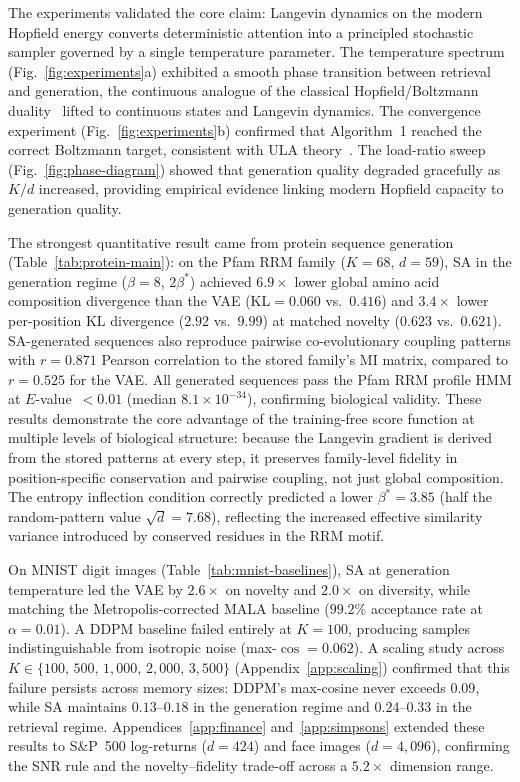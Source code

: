 
The experiments validated the core claim: Langevin dynamics on the modern Hopfield energy converts deterministic attention into a principled stochastic sampler governed by a single temperature parameter.
The temperature spectrum (Fig.~\ref{fig:experiments}a) exhibited a smooth phase transition between retrieval and generation, the continuous analogue of the classical Hopfield/Boltzmann duality~\cite{ackeleyLearningAlgorithmBoltzmann1985} lifted to continuous states and Langevin dynamics. The convergence experiment (Fig.~\ref{fig:experiments}b) confirmed that Algorithm~1 reached the correct Boltzmann target, consistent with ULA theory~\cite{durmusNonasymptoticAnalysisUnadjusted2017}. The load-ratio sweep (Fig.~\ref{fig:phase-diagram}) showed that generation quality degraded gracefully as $K/d$ increased, providing empirical evidence linking modern Hopfield capacity to generation quality.

The strongest quantitative result came from protein sequence generation (Table~\ref{tab:protein-main}): on the Pfam RRM family ($K{=}68$, $d{=}59$), SA in the generation regime ($\beta{=}8$, $2\beta^*$) achieved $6.9{\times}$ lower global amino acid composition divergence than the VAE (KL${=}0.060$ vs.\ $0.416$) and $3.4{\times}$ lower per-position KL divergence ($2.92$ vs.\ $9.99$) at matched novelty ($0.623$ vs.\ $0.621$). SA-generated sequences also reproduce pairwise co-evolutionary coupling patterns with $r{=}0.871$ Pearson correlation to the stored family's MI matrix, compared to $r{=}0.525$ for the VAE. All generated sequences pass the Pfam RRM profile HMM at $E$-value~$<0.01$ (median $8.1{\times}10^{-34}$), confirming biological validity. These results demonstrate the core advantage of the training-free score function at multiple levels of biological structure: because the Langevin gradient is derived from the stored patterns at every step, it preserves family-level fidelity in position-specific conservation and pairwise coupling, not just global composition. The entropy inflection condition correctly predicted a lower $\beta^*{=}3.85$ (half the random-pattern value $\sqrt{d}{=}7.68$), reflecting the increased effective similarity variance introduced by conserved residues in the RRM motif.

On MNIST digit images (Table~\ref{tab:mnist-baselines}), SA at generation temperature led the VAE by $2.6{\times}$ on novelty and $2.0{\times}$ on diversity, while matching the Metropolis-corrected MALA baseline ($99.2\%$ acceptance rate at $\alpha{=}0.01$). A DDPM baseline failed entirely at $K{=}100$, producing samples indistinguishable from isotropic noise (max-$\cos{=}0.062$). A scaling study across $K\in\{100,\,500,\,1{,}000,\,2{,}000,\,3{,}500\}$ (Appendix~\ref{app:scaling}) confirmed that this failure persists across memory sizes: DDPM's max-cosine never exceeds $0.09$, while SA maintains $0.13$--$0.18$ in the generation regime and $0.24$--$0.33$ in the retrieval regime. Appendices~\ref{app:finance} and~\ref{app:simpsons} extended these results to S\&P~500 log-returns ($d{=}424$) and face images ($d{=}4{,}096$), confirming the SNR rule and the novelty--fidelity trade-off across a $5.2{\times}$ dimension range.

